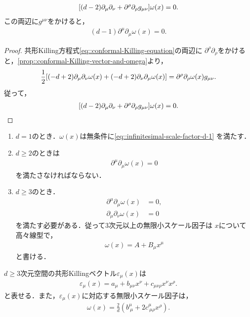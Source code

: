 \begin{prop}
	\begin{align}\label{eq::infinitesimal-scale-factor-d-2}
		\mleft[(d-2)\partial_{\mu}\partial_{\nu}+\partial^{\rho}\partial_{\rho}g_{\mu\nu}\mright]\omega(x)=0.
	\end{align}
	この両辺に\(g^{\mu\nu}\)をかけると，
	\begin{align}\label{eq::infinitesimal-scale-factor-d-1}
		(d-1)\partial^{\mu}\partial_{\mu}\omega(x)=0.
	\end{align}
\end{prop}
\begin{proof}
	共形Killing方程式\cref{eq::conformal-Killing-equation}の両辺に
	\(\partial^{\rho}\partial_{\rho}\)をかけると，\cref{prop::conformal-Killing-vector-and-omega}より，
	\begin{align}
		\frac{1}{2}\mleft[(-d+2)\partial_{\mu}\partial_{\nu}\omega(x)+(-d+2)\partial_{\nu}\partial_{\mu}\omega(x)\mright]=\partial^{\rho}\partial_{\rho}\omega(x)g_{\mu\nu}.
	\end{align}
	従って，
	\begin{align}
		\mleft[(d-2)\partial_{\mu}\partial_{\nu}+\partial^{\rho}\partial_{\rho}g_{\mu\nu}\mright]\omega(x)=0.
	\end{align}
\end{proof}
\begin{enumerate}
	\item \(d=1\)のとき．\(\omega(x)\)は無条件に\cref{eq::infinitesimal-scale-factor-d-1}
	      を満たす．
	\item \(d\geq{}2\)のときは
	      \begin{align}
		      \partial^{\mu}\partial_{\mu}\omega(x)=0
	      \end{align}
	      を満たさなければならない．
	\item \(d\geq{}3\)のとき．
	      \begin{align}
		      \partial^{\mu}\partial_{\mu}\omega(x) & =0, \\
		      \partial_{\mu}\partial_{\nu}\omega(x) & =0
	      \end{align}
	      を満たす必要がある．従って\(3\)次元以上の無限小スケール因子は
	      \(x\)について高々線型で，
	      \begin{align}
		      \omega(x)=A+B_{\mu}x^{\mu}
	      \end{align}
	      と書ける．
\end{enumerate}
\begin{prop}
	\(d\geq{}3\)次元空間の共形Killingベクトル\(\varepsilon_{\mu}(x)\)は
	\begin{align}
		\varepsilon_{\mu}(x)=a_{\mu}+b_{\mu\nu}x^{\nu}+c_{\mu\nu\rho}x^{\nu}x^{\rho}.
	\end{align}
	と表せる．また，\(\varepsilon_{\mu}(x)\)に対応する無限小スケール因子は，
	\begin{align}
		\omega(x)=\frac{2}{d}\left(b^{\mu}_{\ \mu}+2c^{\mu}_{\ \mu\rho}x^{\rho}\right).
	\end{align}
\end{prop}
